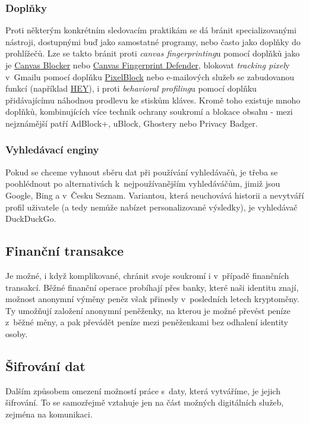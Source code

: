\subsubsection*{Doplňky}
Proti některým konkrétním sledovacím praktikám se dá bránit specializovanými nástroji, dostupnými buď jako samostatné programy, nebo často jako doplňky do prohlížečů.
Lze se takto bránit proti \textit{canvas fingerprinting}u pomocí doplňků jako je \href{https://chrome.google.com/webstore/detail/canvas-blocker-fingerprin/nomnklagbgmgghhjidfhnoelnjfndfpd?hl=en}{Canvas Blocker} nebo \href{https://chrome.google.com/webstore/detail/canvas-fingerprint-defend/lanfdkkpgfjfdikkncbnojekcppdebfp?hl=en}{Canvas Fingerprint Defender}, blokovat \textit{tracking pixel}y v~Gmailu pomocí doplňku \href{https://chrome.google.com/webstore/detail/pixelblock/jmpmfcjnflbcoidlgapblgpgbilinlem?hl=en}{PixelBlock} nebo e-mailových služeb se zabudovanou funkcí (například \href{https://hey.com}{HEY}), i proti \textit{behavioral profiling}u pomocí doplňku přidávajícímu náhodnou prodlevu ke stiskům kláves.
Kromě toho existuje mnoho doplňků, kombinujících více technik ochrany soukromí a blokace obsahu - mezi nejznámější patří AdBlock+, uBlock, Ghostery nebo Privacy Badger.

\subsubsection*{Vyhledávací enginy}
Pokud se chceme vyhnout sběru dat při používání vyhledávačů, je třeba se poohlédnout po alternativách k~nejpoužívanějším vyhledáváčům, jimiž jsou Google, Bing a v~Česku Seznam. Variantou, která neuchovává historii a nevytváří profil uživatele (a tedy nemůže nabízet personalizované výsledky), je vyhledávač DuckDuckGo.

\subsection{Finanční transakce}
Je možné, i když komplikované, chránit svoje soukromí i v~případě finančních transakcí. Běžné finanční operace probíhají přes banky, které naši identitu znají, možnost anonymní výměny peněz však přinesly v~posledních letech kryptoměny. Ty umožňují založení anonymní peněženky, na kterou je možné převést peníze z~běžné měny, a pak převádět peníze mezi peněženkami bez odhalení identity osoby.


\subsection{Šifrování dat}
Dalším způsobem omezení možností práce s~daty, která vytváříme, je jejich šifrování. To se samozřejmě vztahuje jen na část možných digitálních služeb, zejména na komunikaci.
